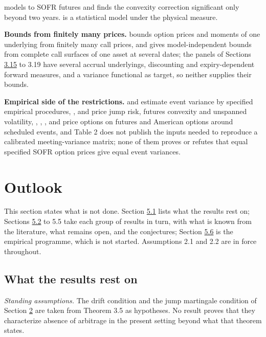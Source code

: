 \documentclass[11pt]{article}
\begin{document}
models to SOFR futures and finds the convexity correction significant only beyond two years. \cite{pennanen2025statistical} is a statistical model under the physical measure.

\textbf{Bounds from finitely many prices.} \cite{bertsimas2002relation} bounds option prices and moments of one underlying from finitely many call prices, and \cite{beiglbock2011model} gives model-independent bounds from complete call surfaces of one asset at several dates; the panels of Sections \hyperref[sec:3.15]{3.15} to 3.19 have several accrual underlyings, discounting and expiry-dependent forward measures, and a variance functional as target, so neither supplies their bounds.

\textbf{Empirical side of the restrictions.} \cite{wright2020event} and \cite{zhong2026spanning} estimate event variance by specified empirical procedures, \cite{kim2014jumps}, \cite{skov2021dynamic} and \cite{collindufresne2002bonds} price jump risk, futures convexity and unspanned volatility, \cite{itkin2024semi}, \cite{lieu1990option}, \cite{chen1993pricing}, \cite{nastasi2018smile} and \cite{leung2014accounting} price options on futures and American options around scheduled events, and \cite{brace2024sofr} Table 2 does not publish the inputs needed to reproduce a calibrated meeting-variance matrix; none of them proves or refutes that equal specified SOFR option prices give equal event variances.

\section{Outlook}\label{sec:5}

This section states what is not done. Section \hyperref[sec:5.1]{5.1} lists what the results rest on; Sections \hyperref[sec:5.2]{5.2} to 5.5 take each group of results in turn, with what is known from the literature, what remains open, and the conjectures; Section \hyperref[sec:5.6]{5.6} is the empirical programme, which is not started. Assumptions 2.1 and 2.2 are in force throughout.

\subsection{What the results rest on}\label{sec:5.1}

\emph{Standing assumptions.} The drift condition and the jump martingale condition of Section \hyperref[sec:2]{2} are taken from \cite{fontana2022term} Theorem 3.5 as hypotheses. No result proves that they characterize absence of arbitrage in the present setting beyond what that theorem states.
\end{document}
